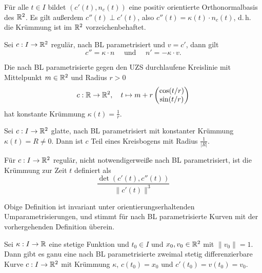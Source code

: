\documentclass{cheat-sheet}
\begin{document}
\begin{bem}
  Für alle $t \in I$ bildet $(c'(t), n_c(t))$ eine positiv orientierte Orthonormalbasis des $\mathbb{R}^2$.
  Es gilt außerdem $c''(t) \perp c'(t)$, also $c''(t) = \kappa(t) \cdot n_c(t)$, d.\,h. die Krümmung ist im $\mathbb{R}^2$ vorzeichenbehaftet.
\end{bem}

\begin{satz}
  Sei $c : I \to \mathbb{R}^2$ regulär, nach BL parametrisiert und $v = c'$, dann gilt
  \[ c'' = \kappa \cdot n \quad \text{ und } \quad n' = -\kappa \cdot v. \]
\end{satz}


\begin{bsp}
  Die nach BL parametrisierte gegen den UZS durchlaufene Kreislinie mit Mittelpunkt $m \in \mathbb{R}^2$ und Radius $r > 0$
  \[ c : \mathbb{R} \to \mathbb{R}^2, \quad t \mapsto m + r \begin{pmatrix} \cos(t/r) \\ \sin(t/r) \end{pmatrix} \]
  hat konstante Krümmung $\kappa(t) = \tfrac{1}{r}$.
\end{bsp}

\begin{satz}
  Sei $c : I \to \mathbb{R}^2$ glatte, nach BL parametrisiert mit konstanter Krümmung $\kappa(t) = R \not= 0$. Dann ist $c$ Teil eines Kreisbogens mit Radius $\tfrac{1}{|R|}$.
\end{satz}

\begin{defn}
  Für $c : I \to \mathbb{R}^2$ regulär, nicht notwendigerweiße nach BL parametrisiert, ist die Krümmung zur Zeit $t$ definiert als
  \[ \frac{\det(c'(t), c''(t))}{ \| c'(t) \|^3 } \]
\end{defn}

\begin{bem}
  Obige Definition ist invariant unter orientierungserhaltenden Umparametrisierungen, und stimmt für nach BL parametrisierte Kurven mit der vorhergehenden Definition überein.
\end{bem}

\begin{satz}
  Sei $\kappa : I \to \mathbb{R}$ eine stetige Funktion und $t_0 \in I$ und $x_0, v_0 \in \mathbb{R}^2$ mit $\| v_0 \| = 1$. Dann gibt es ganu eine nach BL parametrisierte zweimal stetig differenzierbare Kurve $c : I \to \mathbb{R}^2$ mit Krümmung $\kappa$, $c(t_0) = x_0$ und $c'(t_0) = v(t_0) = v_0$.
\end{satz}
\end{document}
